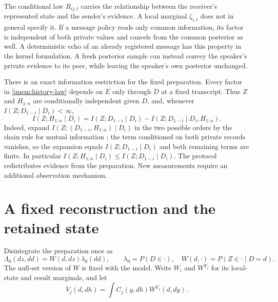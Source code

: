 The conditional law $R_{ij,t}$ carries the relationship between the receiver's represented state and the sender's evidence. A local marginal $\zeta_{i,t}$ does not in general specify it. If a message policy reads only common information, its factor is independent of both private values and cancels from the common posterior as well. A deterministic echo of an already registered message has this property in the kernel formulation. A fresh posterior sample can instead convey the speaker's private evidence to its peer, while leaving the speaker's own posterior unchanged.

There is an exact information restriction for the fixed preparation. Every factor in \cref{imem:history-law} depends on $E$ only through $D$ at a fixed transcript. Thus $Z$ and $H_{1:n}$ are conditionally independent given $D$, and, whenever $I(Z;D_{1-i}\mid D_i)<\infty$,
\begin{equation}
 I(Z;H_{1:n}\mid D_i)
 =I(Z;D_{1-i}\mid D_i)
 -I(Z;D_{1-i}\mid D_i,H_{1:n}).
 \label{imem:information-bound}
\end{equation}
Indeed, expand $I(Z;(D_{1-i},H_{1:n})\mid D_i)$ in the two possible orders by the chain rule for mutual information \citep{CoverThomas2006}; the term conditioned on both private records vanishes, so the expansion equals $I(Z;D_{1-i}\mid D_i)$ and both remaining terms are finite. In particular $I(Z;H_{1:n}\mid D_i)\leq I(Z;D_{1-i}\mid D_i)$. The protocol redistributes evidence from the preparation. New measurements require an additional observation mechanism.

\section{A fixed reconstruction and the retained state}

Disintegrate the preparation once as
\begin{equation}
 \Lambda_0(dz,dd)=W(d,dz)\lambda_0(dd),\qquad
 \lambda_0=P(D\in\cdot),\quad W(d,\cdot)=P(Z\in\cdot\mid D=d).
 \label{imem:fixed-reconstruction}
\end{equation}
The null-set version of $W$ is fixed with the model. Write $W_i$ and $W^{Y_j}$ for its local-state and result marginals, and let
\begin{equation}
 V_j(d,dh)=\int C_j(y,dh)W^{Y_j}(d,dy).
 \label{imem:encoded-reconstruction}
\end{equation}

